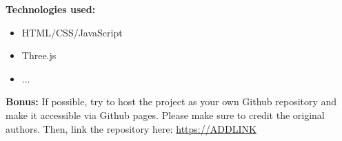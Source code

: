 \documentclass[10pt,oneside,onecolumn,letterpaper]{article}
\begin{document}
  \vspace{.5cm} %

  \noindent\textbf{Technologies used:}

  \begin{itemize}
      \item HTML/CSS/JavaScript
      \item Three.js
      \item ...
  \end{itemize}

  \noindent\textbf{Bonus:} If possible, try to host the project as your own Github repository and make it accessible via Github pages. Please make sure to credit the original authors. Then, link the repository here: \url{https://ADDLINK}

  
\end{document}
